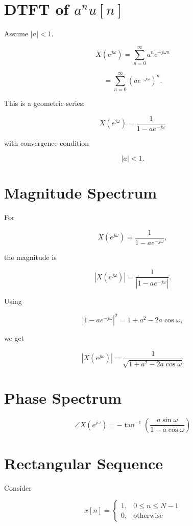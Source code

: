 \section{DTFT of \(a^n u[n]\)}

Assume \(|a|<1\).

\[
X(e^{j\omega})=
\sum_{n=0}^{\infty}
a^n e^{-j\omega n}
\]

\[
=
\sum_{n=0}^{\infty}
(ae^{-j\omega})^n.
\]

This is a geometric series:

\[
\boxed{
X(e^{j\omega})=
\frac{1}{1-ae^{-j\omega}}
}
\]

with convergence condition

\[
|a|<1.
\]


\section{Magnitude Spectrum}

For

\[
X(e^{j\omega})=
\frac{1}{1-ae^{-j\omega}},
\]

the magnitude is

\[
|X(e^{j\omega})|=
\frac{1}{|1-ae^{-j\omega}|}.
\]

Using

\[
|1-ae^{-j\omega}|^2=
1+a^2-2a\cos\omega,
\]

we get

\[
\boxed{
|X(e^{j\omega})|=
\frac{1}{\sqrt{1+a^2-2a\cos\omega}}
}
\]


\section{Phase Spectrum}

\[
\boxed{
\angle X(e^{j\omega})=
-\tan^{-1}
\left(
\frac{a\sin\omega}{1-a\cos\omega}
\right)
}
\]


\section{Rectangular Sequence}

Consider

\[
x[n]=
\begin{cases}
1, & 0\le n\le N-1\\
0, & \text{otherwise}
\end{cases}
\]

